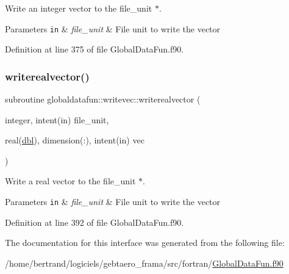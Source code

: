 Write an integer vector to the file\+\_\+unit $\ast$. 


\begin{DoxyParams}[1]{Parameters}
\mbox{\tt in}  & {\em file\+\_\+unit} & File unit to write the vector \\
\hline
\end{DoxyParams}


Definition at line 375 of file Global\+Data\+Fun.\+f90.

\mbox{\label{interfaceglobaldatafun_1_1writevec_a64fd9ea2d0b1776a2844c65a2e7ffac9}} 
\subsubsection{\texorpdfstring{writerealvector()}{writerealvector()}}
{\footnotesize\ttfamily subroutine globaldatafun\+::writevec\+::writerealvector (\begin{DoxyParamCaption}\item[{integer, intent(in)}]{file\+\_\+unit,  }\item[{real(\hyperlink{namespaceglobaldatafun_a5008801201dd34f2af8eae07756befb4}{dbl}), dimension(\+:), intent(in)}]{vec }\end{DoxyParamCaption})\hspace{0.3cm}{\ttfamily [private]}}



Write a real vector to the file\+\_\+unit $\ast$. 


\begin{DoxyParams}[1]{Parameters}
\mbox{\tt in}  & {\em file\+\_\+unit} & File unit to write the vector \\
\hline
\end{DoxyParams}


Definition at line 392 of file Global\+Data\+Fun.\+f90.



The documentation for this interface was generated from the following file\+:\begin{DoxyCompactItemize}
\item 
/home/bertrand/logiciels/gebtaero\+\_\+frama/src/fortran/\hyperlink{_global_data_fun_8f90}{Global\+Data\+Fun.\+f90}\end{DoxyCompactItemize}
